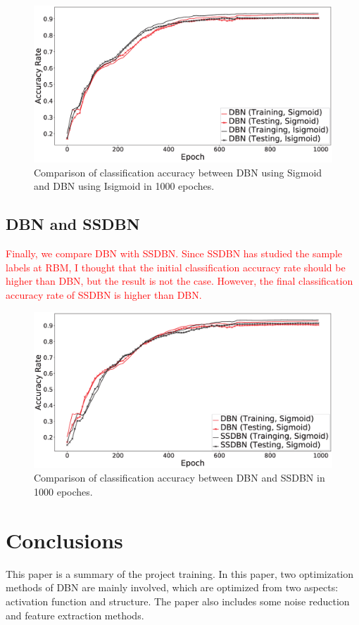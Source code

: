 \documentclass{modified}
\begin{document}
\begin{figure}[htbp]
	\centering
	\includegraphics[width=\columnwidth]{SigmoidVSIsigmoid.eps}
	\caption{Comparison of classification accuracy between DBN using Sigmoid and DBN using Isigmoid in 1000 epoches.}
	\label{fig:SigmoidVSIsigmoid}
\end{figure}

\subsection{DBN and SSDBN}
\textcolor{red}{Finally, we compare DBN with SSDBN. Since SSDBN has studied the sample labels at RBM, I thought that the initial classification accuracy rate should be higher than DBN, but the result is not the case. However, the final classification accuracy rate of SSDBN is higher than DBN.}

\begin{figure}[htbp]
	\centering
	\includegraphics[width=\columnwidth]{SSDBN.eps}
	\caption{Comparison of classification accuracy between DBN and SSDBN in 1000 epoches.}
	\label{fig:SSDBN}
\end{figure}

\section{Conclusions}
This paper is a summary of the project training. In this paper, two optimization methods of DBN are mainly involved, which are optimized from two aspects: activation function and structure. The paper also includes some noise reduction and feature extraction methods.
\end{document}
